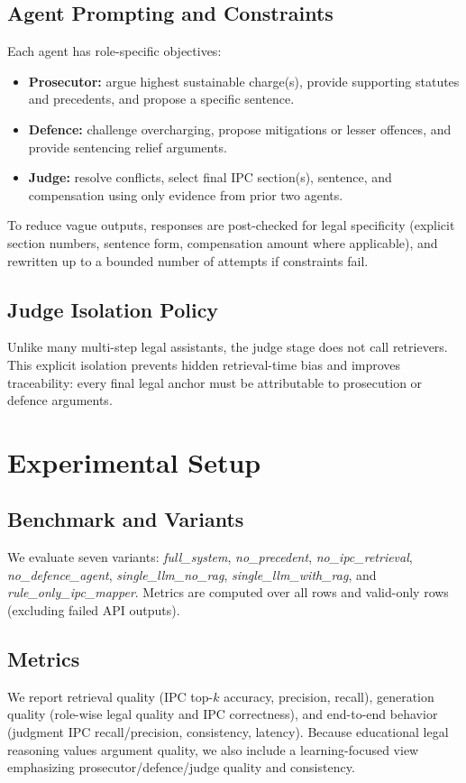 \documentclass[conference]{IEEEtran}
\begin{document}
\subsection{Agent Prompting and Constraints}
Each agent has role-specific objectives:
\begin{itemize}
\item \textbf{Prosecutor:} argue highest sustainable charge(s), provide supporting statutes and precedents, and propose a specific sentence.
\item \textbf{Defence:} challenge overcharging, propose mitigations or lesser offences, and provide sentencing relief arguments.
\item \textbf{Judge:} resolve conflicts, select final IPC section(s), sentence, and compensation using only evidence from prior two agents.
\end{itemize}

To reduce vague outputs, responses are post-checked for legal specificity (explicit section numbers, sentence form, compensation amount where applicable), and rewritten up to a bounded number of attempts if constraints fail.

\subsection{Judge Isolation Policy}
Unlike many multi-step legal assistants, the judge stage does not call retrievers. This explicit isolation prevents hidden retrieval-time bias and improves traceability: every final legal anchor must be attributable to prosecution or defence arguments.

\section{Experimental Setup}
\subsection{Benchmark and Variants}
We evaluate seven variants: \textit{full\_system}, \textit{no\_precedent}, \textit{no\_ipc\_retrieval}, \textit{no\_defence\_agent}, \textit{single\_llm\_no\_rag}, \textit{single\_llm\_with\_rag}, and \textit{rule\_only\_ipc\_mapper}. Metrics are computed over all rows and valid-only rows (excluding failed API outputs).

\subsection{Metrics}
We report retrieval quality (IPC top-$k$ accuracy, precision, recall), generation quality (role-wise legal quality and IPC correctness), and end-to-end behavior (judgment IPC recall/precision, consistency, latency). Because educational legal reasoning values argument quality, we also include a learning-focused view emphasizing prosecutor/defence/judge quality and consistency.
\end{document}
